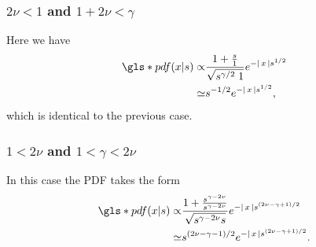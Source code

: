 \subsubsection{$2\nu<1$ and $1 + 2\nu<\gamma$}

Here we have 
%
\begin{align}
\gls*{pdf}(x|s) \propto & \frac{1+\frac{s}{1}}{\sqrt{s^{\gamma /2 } \; 1}} e^{-\abs{x} s^{1/2}}  \\
\simeq & s^{-1/2} e^{-\abs{x} s^{1/2}} ,
\end{align}
%
which is identical to the previous case.

\subsubsection{$1<2\nu$ and $1 <\gamma<2\nu$}

In this case the \gls*{PDF} takes the form 
%
\begin{align}
\gls*{pdf}(x|s) \propto & \frac{1+\frac{s^{\gamma -2\nu}}{s^{\gamma -2\nu}}}{\sqrt{s^{\gamma -2\nu} s}} e^{-\abs{x} s^{(2\nu-\gamma+1)/2}}  \\
\simeq & s^{(2 \nu-\gamma-1)/2} e^{-\abs{x} s^{(2\nu-\gamma+1)/2}} .
\end{align}

